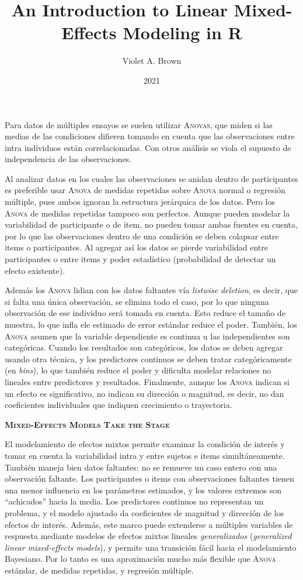 \documentclass[a4paper,12pt]{article}
\title{An Introduction to Linear Mixed-Effects Modeling in R}
\author{Violet A. Brown}
\date{2021}
\begin{document}
{\scshape\bfseries \maketitle}

Para datos de múltiples ensayos se suelen utilizar {\scshape Anovas}, que miden si las medias de las condiciones difieren tomando en cuenta que las observaciones entre intra individuos están correlacionadas. Con otros análisis se viola el supuesto de independencia de las observaciones.

Al analizar datos en los cuales las observaciones se anidan dentro de participantes es preferible usar {\scshape Anova} de medidas repetidas sobre {\scshape Anova} normal o regresión múltiple, pues ambos ignoran la estructura jerárquica de los datos. Pero los {\scshape Anova} de medidas repetidas tampoco son perfectos. Aunque pueden modelar la variabilidad de participante o de item, no pueden tomar ambas fuentes en cuenta, por lo que las observaciones dentro de una condición se deben colapsar entre items o participantes. Al agregar así los datos se pierde variabilidad entre participantes o entre items y poder estadístico (probabilidad de detectar un efecto existente).

Además los {\scshape Anova} lidian con los datos faltantes vía {\itshape listwise deletion}, es decir, que si falta una única observación, se elimina todo el caso, por lo que ninguna observación de ese individuo será tomada en cuenta. Esto reduce el tamaño de muestra, lo que infla ele estimado de error estándar  reduce el poder. También, los {\scshape Anova} asumen que la variable dependiente es continua u las independientes son categóricas. Cuando los resultados son categóricos, los datos se deben agregar usando otra técnica, y los predictores continuos se deben tratar categóricamente (en {\itshape bins}), lo que también reduce el poder y dificulta modelar relaciones no lineales entre predictores y resultados. Finalmente, aunque los {\scshape Anova} indican si un efecto es significativo, no indican su dirección o magnitud, es decir, no dan coeficientes individuales que indiquen crecimiento o trayectoria.

{\scshape\bfseries Mixed-Effects Models Take the Stage}

El modelamiento de efectos mixtos permite examinar la condición de interés y tomar en cuenta la variabilidad intra y entre sujetos e items simultáneamente. También maneja bien datos faltantes: no se remueve un caso entero con una observación faltante. Los participantes o items con observaciones faltantes tienen una menor influencia en los parámetros estimados, y los valores extremos son ``achicados'' hacia la media. Los predictores continuos no representan un problema, y el modelo ajustado da coeficientes de magnitud y dirección de los efectos de interés. Además, este marco puede extenderse a múltiples variables de respuesta mediante modelos de efectos mixtos lineales {\itshape generalizados} ({\itshape generalized linear mixed-effects models}), y permite una transición fácil hacia el modelamiento Bayesiano. Por lo tanto es una aproximación mucho más flexible que {\scshape Anova} estándar, de medidas repetidas, y regresión múltiple.
\end{document}
